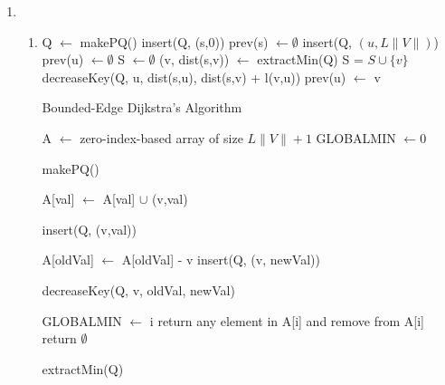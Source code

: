 
\usepackage{amsmath, verbatim, tikz, float, pgfplots, framed}
\usepackage[]{algorithm2e}

\usetikzlibrary{arrows,automata}

\oddsidemargin 0in
\evensidemargin 0in
\textwidth 6.5in
\topmargin -0.5in
\textheight 9.0in
\newcommand{\norm}[1]{\left\lVert #1 \right\rVert}


\pagestyle{myheadings}

\begin{enumerate}
\item
  \begin{enumerate}
  \item
    \begin{algorithm}[H]
      Q $\gets$ makePQ()\;
      insert(Q, (s,0))\;
      prev(s) $\gets \emptyset$\;
       {
        insert(Q, $(u,L\|V\|)$)\;
        prev(u) $\gets \emptyset$\;
      }
      S $\gets \emptyset$\;
       {
        (v, dist(s,v)) $\gets$ extractMin(Q)
        S = $S \cup \{v\}$\;
         {
           {
            decreaseKey(Q, u, dist(s,u), dist(s,v) + l(v,u))\;
            prev(u) $\gets$ v\;
          }
        }
      }
      \caption{Bounded-Edge Dijkstra's Algorithm}
    \end{algorithm}

    \begin{algorithm}[H]
      A $\gets$ zero-index-based array of size $L\|V\| + 1$\;
      GLOBALMIN $\gets 0$
      \caption{makePQ()}
    \end{algorithm}

    \begin{algorithm}[H]
      A[val] $\gets$ A[val] $\cup$ (v,val)\;
      \caption{insert(Q, (v,val))}
    \end{algorithm}

    \begin{algorithm}[H]
      A[oldVal] $\gets$ A[oldVal] - v\;
      insert(Q, (v, newVal))\;
      \caption{decreaseKey(Q, v, oldVal, newVal)}
    \end{algorithm}

    \begin{algorithm}[H]
       {
         {
          GLOBALMIN $\gets$ i\;
          return any element in A[i] and remove from A[i]\;
        }
      }
      return $\emptyset$\;
      \caption{extractMin(Q)}
    \end{algorithm}
    

\end{enumerate}
\end{enumerate}
